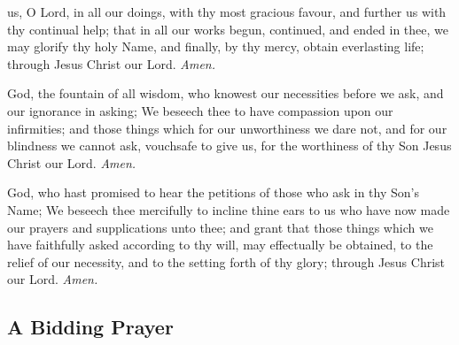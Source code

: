  us, O Lord, in all our doings, with thy most gracious favour, and further us with thy continual help; that in all our works begun, continued, and ended in thee, we may glorify thy holy Name, and finally, by thy mercy, obtain everlasting life; through Jesus Christ our Lord. \textit{Amen.}

 God, the fountain of all wisdom, who knowest our necessities before we ask, and our ignorance in asking; We beseech thee to have compassion upon our infirmities; and those things which for our unworthiness we dare not, and for our blindness we cannot ask, vouchsafe to give us, for the worthiness of thy Son Jesus Christ our Lord. \textit{Amen.}

 God, who hast promised to hear the petitions of those who ask in thy Son's Name; We beseech thee mercifully to incline thine ears to us who have now made our prayers and supplications unto thee; and grant that those things which we have faithfully asked according to thy will, may effectually be obtained, to the relief of our necessity, and to the setting forth of thy glory; through Jesus Christ our Lord. \textit{Amen.}


\clearpage
\subsection{A Bidding Prayer}

